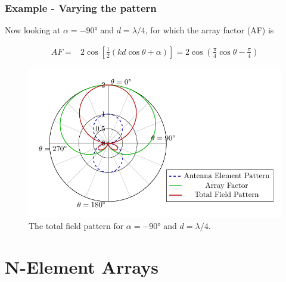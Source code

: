 \documentclass[10pt]{beamer}
\begin{document}
\begin{frame}
    \frametitle{Example - Varying the pattern}

    \begin{outline}
        \1 Now looking at $\alpha = \ang{-90}$ and $d = \lambda/4$, for which the array factor (AF) is
    \end{outline}
    \small
    \begin{align*}
        AF {}=& 2 \cos \left[ \frac{1}{2} \left( k d \cos \theta + \alpha  \right) \right] = 2 \cos \left(\frac{\pi}{4}\cos \theta - \frac{\pi}{4}\right)
    \end{align*}
    \normalsize
\begin{figure}[T!]
    \centering
    \includegraphics[width=.55\textwidth]{total_pattern_d_quarter_alpha_minus90.pdf}
    \caption{The total field pattern for $\alpha = \ang{-90}$ and $d = \lambda/4$.}
    \label{fig:antenna_array}
\end{figure}  

\end{frame}


\section{N-Element Arrays}
\end{document}
